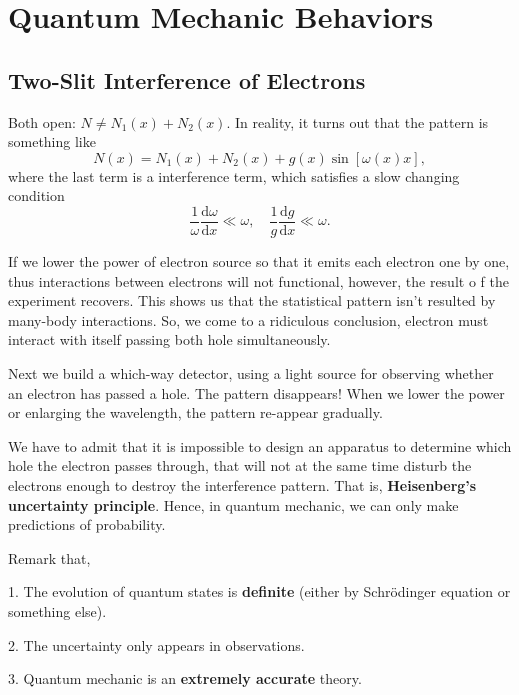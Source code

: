 
\chapter[量子行为]{Quantum Mechanic Behaviors}

\section[电子双缝干涉]{Two-Slit Interference of Electrons}
Both open: $N \neq N_1(x) + N_2(x)$. In reality, it turns out that the pattern is something like 
\begin{equation}
  N(x) = N_1(x) + N_2(x) + g(x)\sin \left[ \omega(x) x\right],
\end{equation}
where the last term is a interference term,
which satisfies a slow changing condition
\begin{equation}
  \frac{1}{\omega} \frac{\mathrm{d}\omega}{\mathrm{d} x} \ll \omega, \quad \frac{1}{g}\frac{\mathrm{d}g}{\mathrm{d} x} \ll \omega.
\end{equation}

If we lower the power of electron source so that it emits each electron one by one, thus interactions between electrons will not functional, however, the result o  f the experiment recovers. This shows us that the statistical pattern isn't resulted by many-body interactions. So, we come to a ridiculous conclusion, electron must interact with itself passing both hole simultaneously.

Next we build a which-way detector, using a light source for observing whether an electron has passed a hole. The pattern disappears! When we lower the power or enlarging the wavelength, the pattern re-appear gradually.

We have to admit that it is impossible to design an apparatus to determine which hole the electron passes through, 
that will not at the same time disturb the electrons enough to destroy the interference pattern.
That is, \textbf{Heisenberg's uncertainty principle}. Hence, in quantum mechanic, we can only make predictions of probability.

Remark that,

1. The evolution of quantum states is \textbf{definite} (either by Schr\"odinger equation or something else).

2. The uncertainty only appears in observations.

3. Quantum mechanic is an \textbf{extremely accurate} theory.